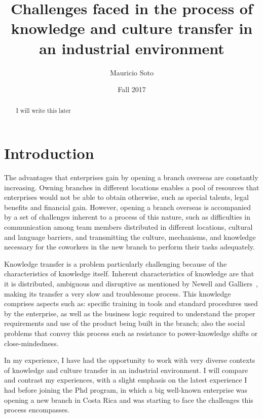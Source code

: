 \documentclass[12pt, letterpaper]{article}
\title{Challenges faced in the process of knowledge and culture transfer in an industrial environment}
\author{Mauricio Soto}
\date{Fall 2017}
\begin{document}
 
\begin{titlepage}
\maketitle
\end{titlepage}

\begin{abstract}
I will write this later
\end{abstract}
 
 
\section{Introduction}

The advantages that enterprises gain by opening a branch overseas are constantly increasing.
Owning branches in different locations enables a pool of resources that enterprises would not be able
to obtain otherwise, such as special talents, legal benefits and financial gain. However, 
opening a branch overseas is accompanied by a set of challenges inherent to a process of this nature, such as 
difficulties in communication among team members distributed in different locations, 
cultural and language barriers, and transmitting the culture, mechanisms, and knowledge necessary for the 
coworkers in the new branch to perform their tasks adequately. 

Knowledge transfer is a problem particularly challenging because of the characteristics of
knowledge itself. Inherent characteristics of knowledge are that it is distributed, ambiguous and 
disruptive as mentioned by Newell and Galliers~\cite{Newell06}, making its transfer a very
slow and troublesome process. 
This knowledge comprises aspects such as: specific training in tools and standard procedures used by the enterprise, as well as the
business logic required to understand the proper requirements and use of the product being built
in the branch; also the social problems that convey this process such as resistance to power-knowledge
shifts or close-mindedness.

In my experience, I have had the opportunity to work with very diverse contexts of knowledge and culture transfer in 
an industrial environment. I will compare and contrast my experiences, with a slight emphasis on the 
latest experience I had before joining the Phd program, in which a big well-known enterprise was 
opening a new branch in Costa Rica and was starting to face the challenges this process encompasses.  
\end{document}
